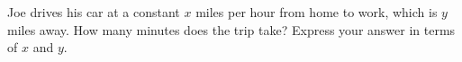 Joe drives his car at a constant $x$ miles per hour from home to work, which is $y$ miles away. How many minutes does the trip take? Express your answer in terms of $x$ and $y$.
